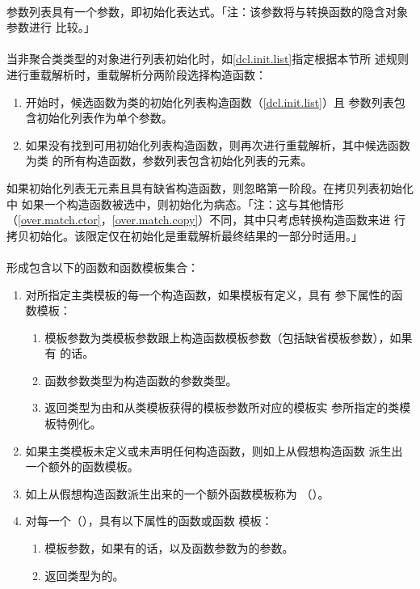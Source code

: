 \paragraph{}
参数列表具有一个参数，即初始化表达式。「注：该参数将与转换函数的隐含对象参数进行
比较。」

\paragraph{}
当非聚合类类型的对象进行列表初始化时，如\ref{dcl.init.list}指定根据本节所
述规则进行重载解析时，重载解析分两阶段选择构造函数：
\begin{enumerate}
  \item{开始时，候选函数为类的初始化列表构造函数（\ref{dcl.init.list}）且
    参数列表包含初始化列表作为单个参数。}
  \item{如果没有找到可用初始化列表构造函数，则再次进行重载解析，其中候选函数为类
    的所有构造函数，参数列表包含初始化列表的元素。}
\end{enumerate}
如果初始化列表无元素且具有缺省构造函数，则忽略第一阶段。在拷贝列表初始化中
如果一个构造函数被选中，则初始化为病态。「注：这与其他情形
（\ref{over.match.ctor}，\ref{over.match.copy}）不同，其中只考虑转换构造函数来进
行拷贝初始化。该限定仅在初始化是重载解析最终结果的一部分时适用。」

\paragraph{}
形成包含以下的函数和函数模板集合：
\begin{enumerate}
  \item{对所指定主类模板的每一个构造函数，如果模板有定义，具有
    参下属性的函数模板：
    \begin{enumerate}
      \item{模板参数为类模板参数跟上构造函数模板参数（包括缺省模板参数），如果有
        的话。}
      \item{函数参数类型为构造函数的参数类型。}
      \item{返回类型为由和从类模板获得的模板参数所对应的模板实
        参所指定的类模板特例化。}
    \end{enumerate}}
  \item{如果主类模板未定义或未声明任何构造函数，则如上从假想构造函数
    派生出一个额外的函数模板。}
  \item{如上从假想构造函数派生出来的一个额外函数模板称为
    （）。}
  \item{对每一个（），具有以下属性的函数或函数
    模板：
    \begin{enumerate}
      \item{模板参数，如果有的话，以及函数参数为的参数。}
      \item{返回类型为的。}
    \end{enumerate}}
\end{enumerate}

